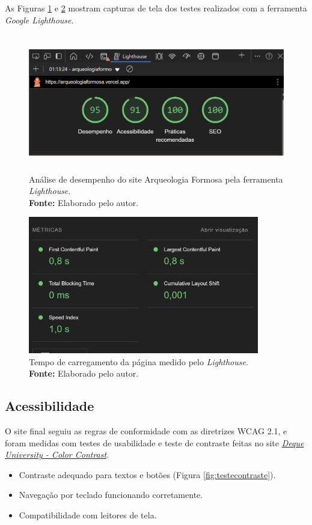As Figuras \ref{fig:lighthouse} e \ref{fig:tempocarregamento} mostram capturas de tela dos testes realizados com a ferramenta \textit{Google Lighthouse}.
\begin{figure}[H]
    \centering
    \includegraphics[height=6cm, keepaspectratio]{img/site/lighthouse_only.png}
    \caption{Análise de desempenho do site Arqueologia Formosa pela ferramenta \textit{Lighthouse}. \\
    \textbf{Fonte:} Elaborado pelo autor.}
    \label{fig:lighthouse}
\end{figure}

\begin{figure}[H]
    \centering
    \includegraphics[height=6cm, keepaspectratio]{img/site/tempo_de_carregamento.png}
    \caption{Tempo de carregamento da página medido pelo \textit{Lighthouse}. \\
    \textbf{Fonte:} Elaborado pelo autor.}
    \label{fig:tempocarregamento}
\end{figure}

\subsection{Acessibilidade}
O site final seguiu as regras de conformidade com as diretrizes WCAG 2.1, e foram medidas com testes de usabilidade e teste de contraste feitas no site \href{https://dequeuniversity.com/rules/axe/4.10/color-contrast}{\textit{Deque University - Color Contrast}}.
\begin{itemize}
    \item Contraste adequado para textos e botões (Figura \ref{fig:testecontraste}).
    \item Navegação por teclado funcionando corretamente.
    \item Compatibilidade com leitores de tela.
\end{itemize}

